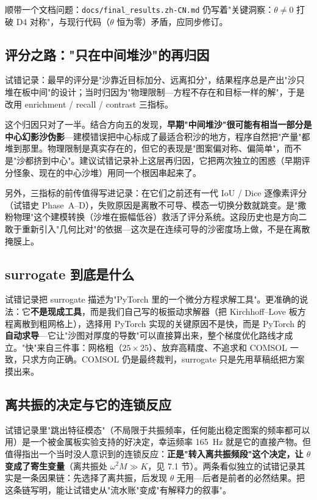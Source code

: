 \documentclass[11pt,a4paper]{article}
\newcommand{\code}[1]{\texttt{#1}}
\begin{document}
顺带一个文档问题：\code{docs/final\_results.zh-CN.md} 仍写着"关键洞察：$\theta\neq 0$ 打破 D4 对称"，与现行代码（$\theta$ 恒为零）矛盾，应同步修订。

\subsection{评分之路："只在中间堆沙"的再归因}

试错记录：最早的评分是"沙靠近目标加分、远离扣分"，结果程序总是产出"沙只堆在板中间"的设计；当时归因为"物理限制---方程不存在和目标一样的解"，于是改用 enrichment / recall / contrast 三指标。

这个归因只对了一半。结合方向五的发现，\textbf{早期"中间堆沙"很可能有相当一部分是中心幻影沙伪影}---建模错误把中心标成了最适合积沙的地方，程序自然把"产量"都堆到那里。物理限制是真实存在的，但它的表现是"图案偏对称、偏简单"，而不是"沙都挤到中心"。建议试错记录补上这层再归因，它把两次独立的困惑（早期评分怪象、现在的中心沙堆）用同一个根因串起来了。

另外，三指标的前传值得写进记录：在它们之前还有一代 IoU / Dice 逐像素评分（试错史 Phase~A--D），失败原因是离散不可导、模态一切换分数就跳变。是"撒粉物理"这个建模转换（沙堆在振幅低谷）救活了评分系统。这段历史也是方向二敢于重新引入"几何比对"的依据---这次是在连续可导的沙密度场上做，不是在离散掩膜上。

\subsection{surrogate 到底是什么}

试错记录把 surrogate 描述为"PyTorch 里的一个微分方程求解工具"。更准确的说法：它\textbf{不是现成工具}，而是我们自己写的板振动求解器（把 Kirchhoff--Love 板方程离散到粗网格上），选择用 PyTorch 实现的关键原因不是快，而是 PyTorch 的\textbf{自动求导}---它让"沙图对厚度的导数"可以直接算出来，整个梯度优化路线才成立。"快"来自三件事：网格粗（$25\times 25$）、放弃高精度、不追求和 COMSOL 一致，只求方向正确。COMSOL 仍是最终裁判，surrogate 只是先用草稿纸把方案摸出来。

\subsection{离共振的决定与它的连锁反应}

试错记录里"跳出特征模态"（不局限于共振频率，任何能出稳定图案的频率都可以用）是一个被金属板实验支持的好决定，幸运频率 165~Hz 就是它的直接产物。但值得指出一个当时没人意识到的连锁反应：\textbf{正是"转入离共振频段"这个决定，让 $\theta$ 变成了寄生变量}（离共振处 $\omega^2 M \gg K$，见 7.1 节）。两条看似独立的试错记录其实是一条因果链：先选择了离共振，后发现 $\theta$ 无用---后者是前者的必然结果。把这条链写明，能让试错史从"流水账"变成"有解释力的叙事"。
\end{document}
